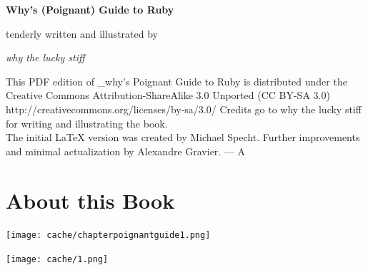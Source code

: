 \documentclass[12pt,twoside]{report}
\renewcommand{\headrulewidth}{0.25pt}
\renewcommand{\headrulewidth}{0pt}
\begin{document}
\pagestyle{empty}
\begin{titlepage}
\begin{center}
\vspace*{2cm}
\normalfont\noindent\bf\Huge{Why's (Poignant) Guide to Ruby}

\vfill

\normalfont\noindent\large{tenderly written and illustrated by}

\vspace*{-0.2cm}

\normalfont\noindent\large{\em why the lucky stiff}
\end{center}
\end{titlepage}
\newpage
\thispagestyle{empty}
\mbox{}

\newpage
\pagestyle{empty}
\begin{center}
\vspace*{4cm}
This PDF edition of \_why's Poignant Guide to Ruby is distributed
under the Creative Commons Attribution-ShareAlike 3.0 Unported 
(CC BY-SA 3.0)
http://creativecommons.org/licenses/by-sa/3.0/
\vfill
Credits go to why the lucky stiff for writing and illustrating the
book.\\
The initial LaTeX version was created by Michael Specht. Further
improvements and minimal actualization by Alexandre Gravier.
\hspace{8.5cm}--- A
\vspace{5cm}
\end{center}
\newpage
\thispagestyle{empty}
\mbox{}

\cleartoevenpage
\setcounter{page}{2}
\setcounter{tocdepth}{1}
\setcounter{secnumdepth}{2}
\begin{spacing}{1.135}
\tableofcontents
\end{spacing}

\newpage

\thispagestyle{empty}

\pagestyle{fancy}

 {
  \renewcommand{\headrulewidth}{0.25pt}
  \fancyhf{}
  \fancyhead[EL,OR]{\thepage}
}
\cleartooddpage


\chapter{About this Book}
\vfill
\begin{center}
  \texttt{[image: cache/chapterpoignantguide1.png]}
\end{center}
\vspace{4.6cm}
\newpage
\thispagestyle{empty}
\mbox{}
\clearpage
	\texttt{[image: cache/1.png]} 
\end{document}
